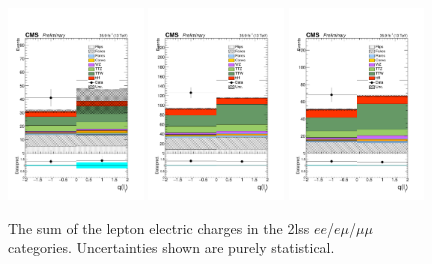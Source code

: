 \begin{figure}[htp]
\centering
\includegraphics[width=0.32\textwidth]{ch5_figs/qSum_ttH_ee_stackPlot_SR.pdf}
\includegraphics[width=0.32\textwidth]{ch5_figs/qSum_ttH_em_stackPlot_SR.pdf}
\includegraphics[width=0.32\textwidth]{ch5_figs/qSum_ttH_mm_stackPlot_SR.pdf} \\
\caption[Data/MC comparison of sum of the lepton electric charges in the signal region]{The sum of the lepton electric charges in the 2lss $ee$/$e\mu$/$\mu\mu$ categories. Uncertainties shown are purely statistical.}
\label{fig:sr_qsum}
\end{figure}

